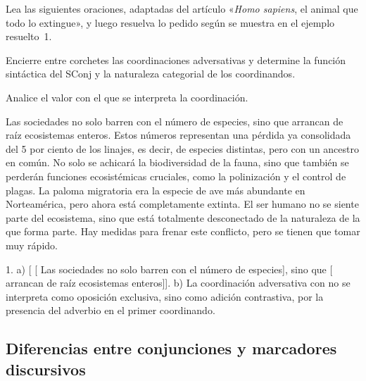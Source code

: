 \begin{ejercicio}\label{ej:12-adversativas}
Lea las siguientes oraciones, adaptadas del artículo «\textit{Homo sapiens}, el
animal que todo lo extingue», y luego resuelva lo pedido según se muestra en el
ejemplo resuelto~1.

\begin{consignas}
  \item Encierre entre corchetes las coordinaciones adversativas y determine la
        función sintáctica del SConj y la naturaleza categorial de los
        coordinandos.
  \item Analice el valor con el que se interpreta la coordinación.
\end{consignas}

\begin{exe}
  \ex Las sociedades no solo barren con el número de especies, sino que arrancan
      de raíz ecosistemas enteros.
  \ex Estos números representan una pérdida ya consolidada del 5 por ciento de
      los linajes, es decir, de especies distintas, pero con un ancestro en
      común.
  \ex No solo se achicará la biodiversidad de la fauna, sino que también se
      perderán funciones ecosistémicas cruciales, como la polinización y el
      control de plagas.
  \ex La paloma migratoria era la especie de ave más abundante en Norteamérica,
      pero ahora está completamente extinta.
  \ex El ser humano no se siente parte del ecosistema, sino que está totalmente
      desconectado de la naturaleza de la que forma parte.
  \ex Hay medidas para frenar este conflicto, pero se tienen que tomar muy
      rápido.
\end{exe}

\begin{resuelto}
1. a) [ [ Las sociedades no solo barren con el número
de especies], sino que [ arrancan de raíz ecosistemas
enteros]]. b) La coordinación adversativa con  no se interpreta como
oposición exclusiva, sino como adición contrastiva, por la presencia del
adverbio  en el primer coordinando.
\end{resuelto}
\end{ejercicio}

\subsection{Diferencias entre conjunciones y marcadores discursivos}\label{sec:12-marcadores}


